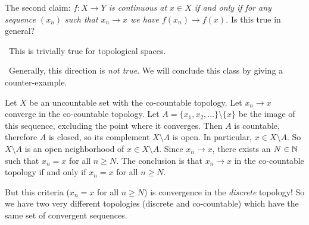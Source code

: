 \begin{example}
The second claim: \textit{$f\colon X\to Y$ is continuous at $x\in X$ if and
only if for any sequence $(x_{n})$ such that $x_{n}\to x$ we have
$f(x_{n})\to f(x)$.} Is this true in general?

\forwardproof\ This is trivially true for topological spaces.

\backwardproof\ Generally, this direction is \emph{not true}. We will
conclude this class by giving a counter-example.

Let $X$ be an uncountable set with the co-countable topology. Let
$x_{n}\to x$ converge in the co-countable topology. Let
$A=\{x_{1},x_{2},\dots\}\setminus\{x\}$ be the image of this sequence,
excluding the point where it converges. Then $A$ is countable,
therefore $A$ is closed, so its complement $X\setminus A$ is open. In
particular, $x\in X\setminus A$. So $X\setminus A$ is an open
neighborhood of $x\in X\setminus A$. Since $x_{n}\to x$, there exists
an $N\in\mathbb{N}$ such that $x_{n}=x$ for all $n\geq N$. The conclusion is
that $x_{n}\to x$ in the co-countable topology if and only if
$x_{n}=x$ for all $n\geq N$.

But this criteria ($x_{n}=x$ for all $n\geq N$) is convergence in the
\emph{discrete} topology! So we have two very different topologies
(discrete and co-countable) which have the same set of convergent
sequences. 
\end{example}

